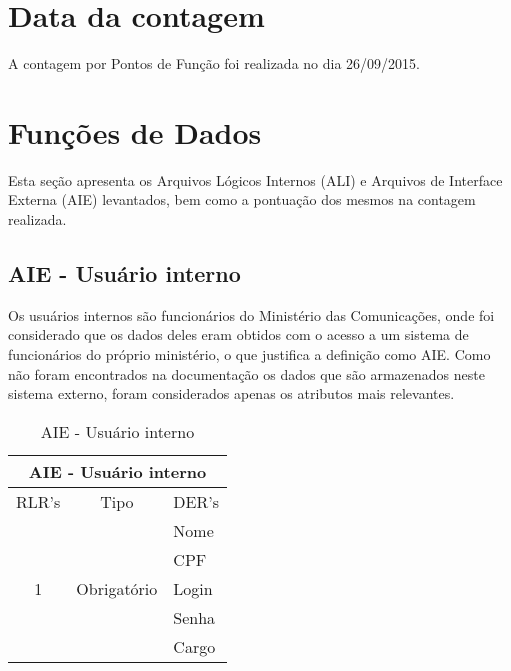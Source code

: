 \section{Data da contagem}

  A contagem por Pontos de Função foi realizada no dia 26/09/2015.

\section{Funções de Dados}

Esta seção apresenta os Arquivos Lógicos Internos (ALI) e Arquivos de Interface Externa (AIE) levantados, bem como a 
pontuação dos mesmos na contagem realizada.
     
  \subsection{AIE - Usuário interno}
      
      Os usuários internos são funcionários do Ministério das Comunicações, onde foi considerado que os dados deles
      eram obtidos com o acesso a um sistema de funcionários do próprio ministério, o que justifica a definição como AIE.
      Como não foram encontrados na documentação os dados que são armazenados neste sistema externo,
      foram considerados apenas os atributos mais relevantes.
      
      \begin{table}[!h]
      \centering
      \caption{AIE - Usuário interno}
      \label{aie_usuario_interno}
      \begin{tabular}{|c|c|l|}
      \hline
      \multicolumn{3}{|c|}{AIE - Usuário interno}                                             \\ \hline
      \multicolumn{1}{|l|}{RLR's} & Tipo                         & \multicolumn{1}{c|}{DER's} \\ \hline
      \multirow{5}{*}{1}          & \multirow{5}{*}{Obrigatório} & Nome                       \\ \cline{3-3} 
				  &                              & CPF                        \\ \cline{3-3} 
				  &                              & Login                      \\ \cline{3-3} 
				  &                              & Senha                      \\ \cline{3-3}
                                  &		                 & Cargo                      \\ \hline
      \end{tabular}
      \end{table}
      
